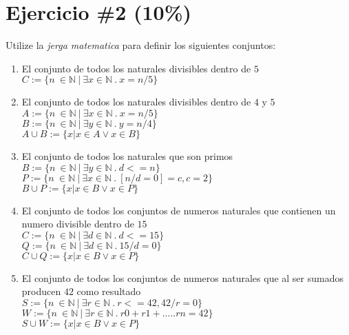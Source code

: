 \documentclass[10pt,a4paper]{article}
\begin{document}
\section*{Ejercicio \#2 (10\%)}
Utilize la \emph{jerga matematica} para definir los siguientes conjuntos:
\begin{enumerate}
        \item{El conjunto de todos los naturales divisibles dentro de $5$} \\
         $C:=\{n\ \in \mathbb{N}\ |\ \exists x \in \mathbb{N}\ .\ x=n/5 \}$
        \item{El conjunto de todos los naturales divisibles dentro de $4$ y $5$} \\
        $A:=\{n\ \in \mathbb{N}\ |\ \exists x \in \mathbb{N}\ .\ x=n/5 \}$\\
        $B:=\{n\ \in \mathbb{N}\ |\ \exists y \in \mathbb{N}\ .\ y=n/4\}$\\
        $A\cup B:=\{x|x\in A\vee x\in B\}$
        \item{El conjunto de todos los naturales que son primos} \\
        $B:=\{n\ \in \mathbb{N}\ |\ \exists y \in \mathbb{N}\ .\ d<= n\}$\\
        $P:=\{n\ \in \mathbb{N}\ |\ \exists x \in \mathbb{N}\ .\ [n / d = 0 ]=c , c=2 \}$\\
        $B\cup P:=\{x|x\in B\vee x\in P\}$		
        \item{El conjunto de todos los conjuntos de numeros naturales que contienen
        un numero divisible dentro de $15$}\\
       $C:=\{n\ \in \mathbb{N}\ |\ \exists d \in \mathbb{N}\ .\ d<= 15 \}$\\
        $Q:=\{n\ \in \mathbb{N}\ |\ \exists d \in \mathbb{N}\ .\ 15 / d = 0 \}$\\
        $C\cup Q:=\{x|x\in B\vee x\in P\}$		 
        \item{El conjunto de todos los conjuntos de numeros naturales que al ser sumados
        producen $42$ como resultado}\\
	   $S:=\{n\ \in \mathbb{N}\ |\ \exists r \in \mathbb{N}\ .\ r<= 42, 42/r=0 \}$\\
        $W:=\{n\ \in \mathbb{N}\ |\ \exists r \in \mathbb{N}\ .\  r0+r1+.....rn = 42 \}$\\
        $S\cup W:=\{x|x\in B\vee x\in P\}$
\end{enumerate}
\end{document}
